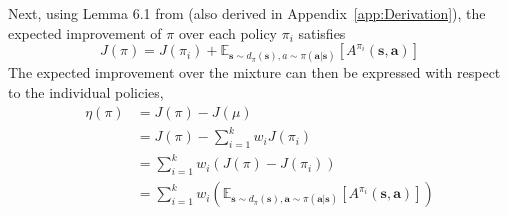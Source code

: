 \documentclass{article} \usepackage{iclr2020_conference,times}
\def\rva{{\mathbf{a}}}
\def\rvs{{\mathbf{s}}}
\newcommand{\weighti}{w_i}
\newcommand{\pii}{\pi_i}
\newcommand{\expec}{\mathbb{E}}
\begin{document}
Next, using Lemma 6.1 from \citet{Kakade2002} (also derived in Appendix~\ref{app:Derivation}), the expected improvement of $\pi$ over each policy $\pi_i$ satisfies
\begin{equation}
    J(\pi) = J(\pii) + \expec_{\rvs \sim d_\pi(\rvs), a \sim \pi(\rva|\rvs)}\left[A^{\pii}(\rvs, \rva)\right]
    \label{app_eqn:improvement}
\end{equation}
The expected improvement over the mixture can then be expressed with respect to the individual policies,
\begin{align}
    \eta(\pi) & = J(\pi) - J(\mu) \\
    & = J(\pi) - \sum_{i=1}^k \weighti J(\pii) \\
    & = \sum_{i=1}^k \weighti \left( J(\pi) - J(\pii) \right)\\
    & = \sum_{i=1}^k \weighti \left( \expec_{\rvs \sim d_{\pi}(\rvs), \rva \sim \pi(\rva|\rvs)} \left[A^{\pii}(\rvs, \rva) \right] \right)
    \label{app_eqn:policy_improvement_buffer}
\end{align}
\end{document}
